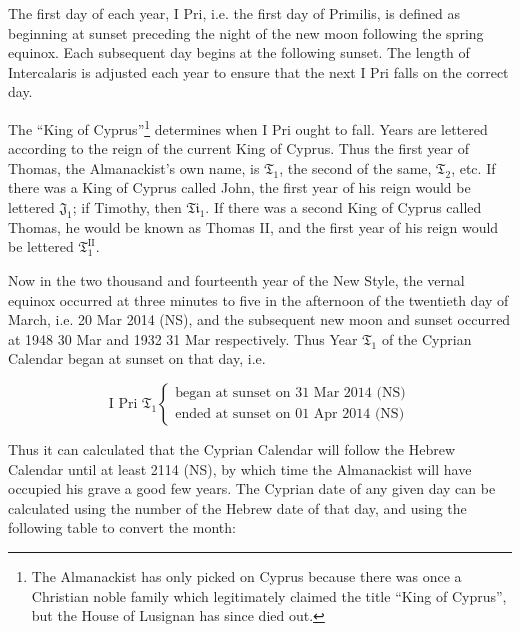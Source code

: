 \documentclass[0main.tex]{subfiles}
\begin{document}
The first day of each year, I Pri, i.e. the first day of Primilis, is defined as beginning at sunset preceding the night of the new moon following the spring equinox. Each subsequent day begins at the following sunset. The length of Intercalaris is adjusted each year to ensure that the next I Pri falls on the correct day.

The ``King of Cyprus''\footnote{The Almanackist has only picked on Cyprus because there was once a Christian noble family which legitimately claimed the title ``King of Cyprus'', but the House of Lusignan has since died out.} determines when I Pri ought to fall. Years are lettered according to the reign of the current King of Cyprus. Thus the first year of Thomas, the Almanackist's own name, is $\mathfrak{T}_1$, the second of the same, $\mathfrak{T}_2$, etc. If there was a King of Cyprus called John, the first year of his reign would be lettered $\mathfrak{J}_1$; if Timothy, then $\mathfrak{Ti}_1$. If there was a second King of Cyprus called Thomas, he would be known as Thomas II, and the first year of his reign would be lettered $\mathfrak{T}^\text{II}_1$.

Now in the two thousand and fourteenth year of the New Style, the  vernal equinox occurred at three minutes to five in the afternoon of the twentieth day of March, i.e. 20 Mar 2014 (NS), and the subsequent new moon and sunset occurred at 1948 30 Mar and 1932 31 Mar respectively. Thus Year $\mathfrak{T}_1$ of the Cyprian Calendar began at sunset on that day, i.e.

\[\text{I Pri $\mathfrak{T}_1$} \left\{
\begin{array}{c}
\text{began at sunset on 31 Mar 2014 (NS)}\\
\text{ended at sunset on 01 Apr 2014 (NS)}
\end{array}
\right.
\]

\bigskip

Thus it can calculated that the Cyprian Calendar will follow the Hebrew Calendar until at least 2114 (NS), by which time the Almanackist will have occupied his grave a good few years. The Cyprian date of any given day can be calculated using the number of the Hebrew date of that day, and using the following table to convert the month:
\end{document}
